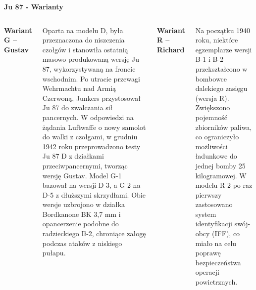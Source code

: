 \begin{frame}[t]{\Huge{\textbf{Ju 87 - Warianty}}}
	\begin{columns}[t]

{\large{\textbf{Wariant G – Gustav}}}	\\~\
	\justifying
	
Oparta na modelu D, była przeznaczona do niszczenia czołgów i stanowiła ostatnią masowo produkowaną wersję Ju 87, wykorzystywaną na froncie wschodnim. Po utracie przewagi Wehrmachtu nad Armią Czerwoną, Junkers przystosował Ju 87 do zwalczania sił pancernych. W odpowiedzi na żądania Luftwaffe o nowy samolot do walki z czołgami, w grudniu 1942 roku przeprowadzono testy Ju 87 D z działkami przeciwpancernymi, tworząc wersję Gustav. Model G-1 bazował na wersji D-3, a G-2 na D-5 z dłuższymi skrzydłami. Obie wersje uzbrojono w działka Bordkanone BK 3,7 mm i opancerzenie podobne do radzieckiego Ił-2, chroniące załogę podczas ataków z niskiego pułapu.

		
{\large{\textbf{Wariant R – Richard}}}	\\~\
	\justifying
	
Na początku 1940 roku, niektóre egzemplarze wersji B-1 i B-2 przekształcono w bombowce dalekiego zasięgu (wersja R). Zwiększono pojemność zbiorników paliwa, co ograniczyło możliwości ładunkowe do jednej bomby 25 kilogramowej. W modelu R-2 po raz pierwszy zastosowano system identyfikacji swój-obcy (IFF), co miało na celu poprawę bezpieczeństwa operacji powietrznych.

	\end{columns}
\end{frame}